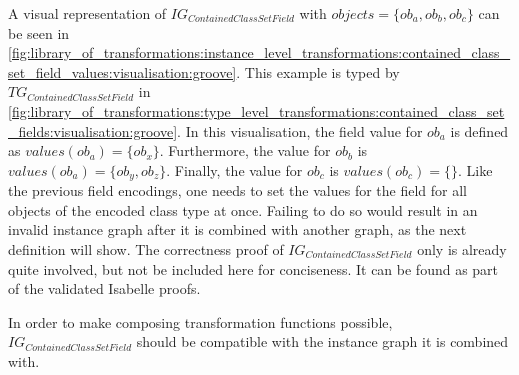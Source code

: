 A visual representation of $IG_{ContainedClassSetField}$ with $objects = \{ob_a, ob_b, ob_c\}$ can be seen in \cref{fig:library_of_transformations:instance_level_transformations:contained_class_set_field_values:visualisation:groove}. This example is typed by $TG_{ContainedClassSetField}$ in \cref{fig:library_of_transformations:type_level_transformations:contained_class_set_fields:visualisation:groove}. In this visualisation, the field value for $ob_a$ is defined as $values(ob_a) = \{ob_x\}$. Furthermore, the value for $ob_b$ is $values(ob_a) = \{ob_y, ob_z\}$. Finally, the value for $ob_c$ is $values(ob_c) = \{\}$. Like the previous field encodings, one needs to set the values for the field for all objects of the encoded class type at once. Failing to do so would result in an invalid instance graph after it is combined with another graph, as the next definition will show. The correctness proof of $IG_{ContainedClassSetField}$ only is already quite involved, but not be included here for conciseness. It can be found as part of the validated Isabelle proofs.

In order to make composing transformation functions possible, $IG_{ContainedClassSetField}$ should be compatible with the instance graph it is combined with.

